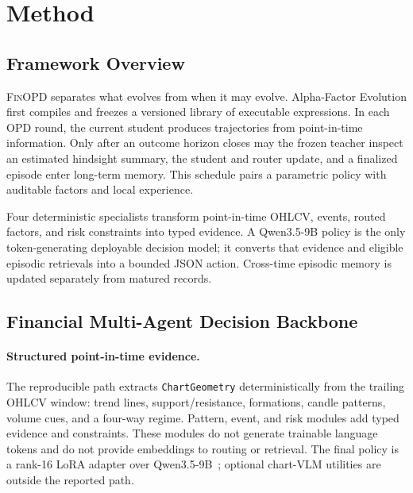 \section{Method}
\label{sec:method}
\begingroup
\setlength{\abovedisplayskip}{5pt plus 2pt minus 2pt}
\setlength{\belowdisplayskip}{5pt plus 2pt minus 2pt}
\setlength{\abovedisplayshortskip}{3pt plus 2pt minus 1pt}
\setlength{\belowdisplayshortskip}{4pt plus 2pt minus 1pt}
\setlength{\jot}{2pt}

\subsection{Framework Overview}

\textsc{FinOPD} separates what evolves from when it may evolve. Alpha-Factor Evolution first compiles and freezes a versioned library of executable expressions. In each OPD round, the current student produces trajectories from point-in-time information. Only after an outcome horizon closes may the frozen teacher inspect an estimated hindsight summary, the student and router update, and a finalized episode enter long-term memory. This schedule pairs a parametric policy with auditable factors and local experience.

Four deterministic specialists transform point-in-time OHLCV, events, routed factors, and risk constraints into typed evidence. A Qwen3.5-9B policy is the only token-generating deployable decision model; it converts that evidence and eligible episodic retrievals into a bounded JSON action. Cross-time episodic memory is updated separately from matured records.

\subsection{Financial Multi-Agent Decision Backbone}

\paragraph{Structured point-in-time evidence.}
\label{sec:point_in_time_evidence}
The reproducible path extracts \texttt{ChartGeometry} deterministically from the trailing OHLCV window: trend lines, support/resistance, formations, candle patterns, volume cues, and a four-way regime. Pattern, event, and risk modules add typed evidence and constraints. These modules do not generate trainable language tokens and do not provide embeddings to routing or retrieval. The final policy is a rank-16 LoRA adapter over Qwen3.5-9B~\cite{qwen35_2026}; optional chart-VLM utilities are outside the reported path.

